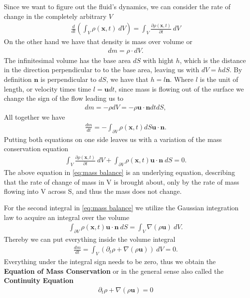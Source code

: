Since we want to figure out the fluid's dynamics, we can consider the rate
of change in the completely arbitrary $V$
\begin{align}
    \frac{d}{dt}\left( \int_V \rho(\mathbf{x}, t)\ dV \right) = \int_V
    \frac{\partial \rho(\mathbf{x}, t)}{\partial t} \ dV
\end{align}
On the other hand we have that density is mass over volume or
\begin{align}
    dm = \rho \cdot dV.
\end{align}
The infinitesimal volume has the base area $dS$ with hight $h$, which is the
distance in the direction perpendicular to to the base area, leaving us with
$dV = h dS$. By definition $\mathbf{n}$ is perpendicular to $dS$, we have
that $h = l \mathbf{n}$. Where $l$ is the unit of length, or velocity times
time $l = \mathbf{u} dt$, since mass is flowing out of the surface we
change the sign of the flow leading us to
\begin{align}
   dm  = -\rho dV = -\rho \mathbf{u} \cdot \mathbf{n} dt dS,
\end{align}
All together we have
\begin{align}
    \frac{dm}{dt} = -\int_{\partial V} \rho(\mathbf{x},t) dS
    \mathbf{u}\cdot\mathbf{n}.
\end{align}
Putting both equations on one side leaves us with a variation of the mass
conservation equation
\begin{align}\label{eq:mass balance}
     \int_V \frac{\partial \rho(\mathbf{x}, t)}{\partial t}\ dV
    +\int_{\partial V} \rho(\mathbf{x}, t) \mathbf{u}\cdot\mathbf{n}\ dS
    = 0.
\end{align}
The above equation in \ref{eq:mass balance} is an underlying equation, describing that the rate of
change of mass in V is brought about, only by the rate of mass flowing into
V across S, and thus the mass does not change.

For the second integral in \ref{eq:mass balance} we utilize the Gaussian
integration law to acquire an integral over the volume
\begin{align}
    \int_{\partial V} \rho(\mathbf{x}, t) \mathbf{u} \cdot \mathbf{n} \ dS =
    \int_V \nabla (\rho \mathbf{u})\ dV.
\end{align}
Thereby we can put everything inside the volume integral
\begin{align}
    \frac{d m}{dt} = \int_V \left(\partial_t \rho + \nabla(\rho \mathbf{u}) \right) \ dV = 0.
\end{align}
Everything under the integral sign needs to be zero, thus we obtain
the \textbf{Equation of Mass Conservation} or in the general sense also
called the \textbf{Continuity Equation}
\begin{align}\label{eq:continuity}
    \partial_t \rho + \nabla(\rho \mathbf{u}) = 0
\end{align}

